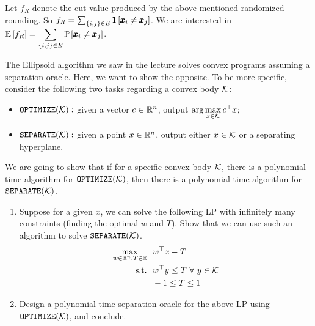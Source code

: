 Let $f_{R}$ denote the cut value produced by the above-mentioned randomized rounding. So $f_{R} = \sum_{\left\{i,j\right\}\in E} \pmb 1\left[\pmb x_{i}\ne \pmb x_{j}\right]$. We are interested in $\displaystyle \mathbb E\left[ f_{R} \right] = \sum_{\left\{i,j\right\}\in E} \mathbb P\left[ \pmb x_{i}\ne \pmb x_{j} \right]$.










\newpage
\pb
The Ellipsoid algorithm we saw in the lecture solves convex programs assuming a separation oracle. Here, we want to show the opposite. To be more specific, consider the following two tasks regarding a convex body ${\mathcal{K}}$:
\begin{itemize}
\item $\texttt{OPTIMIZE}({\mathcal{K}}):$ given a vector $c\in\mathbb{R}^{n}$, output $\arg\max\limits_{x\in{\mathcal{K}}}c^{\top}x$;
\item $\texttt{SEPARATE}({\mathcal{K}}):$ given a point $x\in\mathbb{R}^{n}$, output either $x\in {\mathcal{K}}$ or a separating hyperplane.
\end{itemize}

We are going to show that if for a specific convex body ${\mathcal{K}}$, there is a polynomial time algorithm for $\texttt{OPTIMIZE}({\mathcal{K}})$, then there is a polynomial time algorithm for $\texttt{SEPARATE}({\mathcal{K}})$.
\begin{enumerate}[label = (\alph*)]
\item Suppose for a given $x$, we can solve the following LP with infinitely many constraints (finding the optimal $w$ and $T$). Show that we can use such an algorithm to solve $\texttt{SEPARATE}({\mathcal{K}})$.
\begin{equation}\label{margin}
\begin{aligned}
\max_{w\in \mathbb{R}^{n},T\in\mathbb{R}} &~~ w^{\top} x-T\\
\text{s.t.} &~~ w^{\top} y \le T~\forall~ y\in{\mathcal{K}}\\
&~~ -1\le T\le 1
\end{aligned}
\end{equation}
\item Design a polynomial time separation oracle for the above LP using $\texttt{OPTIMIZE}({\mathcal{K}})$, and conclude.
\end{enumerate}


\soln

